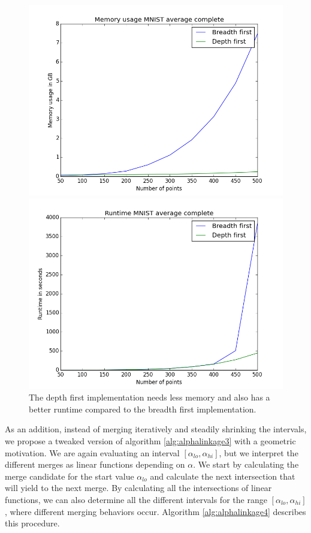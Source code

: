 \begin{figure}
\centering
\begin{minipage}{.45\textwidth}
  \centering
  \includegraphics[width=\linewidth]{plots/memory_mnist_ac}
\end{minipage}\hfill
\begin{minipage}{.45\textwidth}
  \centering
  \includegraphics[width=\linewidth]{plots/runtime_mnist_ac}
\end{minipage}
\caption{The depth first implementation needs less memory and also has a better runtime compared to the breadth first implementation.}
\label{fig:performance}
\end{figure}

As an addition, instead of merging iteratively and steadily shrinking the intervals, we propose a tweaked version of algorithm \ref{alg:alphalinkage3} with a geometric motivation. We are again evaluating an interval $[\alpha_{lo}, \alpha_{hi}]$, but we interpret the different merges as linear functions depending on $\alpha$. We start by calculating the merge candidate for the start value $\alpha_{lo}$ and calculate the next intersection that will yield to the next merge. By calculating all the intersections of linear functions, we can also determine all the different intervals for the range $[\alpha_{lo}, \alpha_{hi}]$, where different merging behaviors occur. Algorithm \ref{alg:alphalinkage4} describes this procedure.

